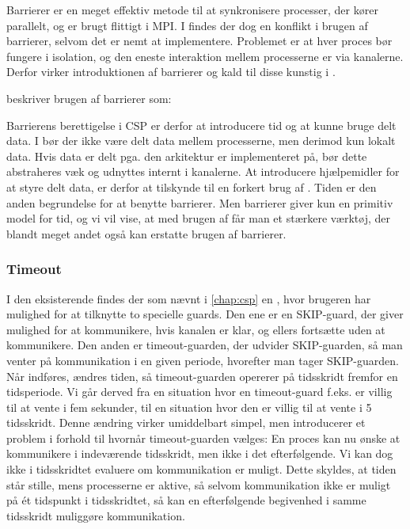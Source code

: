 Barrierer er en meget effektiv metode til at synkronisere processer, der kører 
parallelt, og er brugt flittigt i MPI. I \csp findes der dog en konflikt i brugen 
af barrierer, selvom det er nemt at implementere. Problemet er at hver proces bør fungere i isolation, og den eneste interaktion mellem processerne er via kanalerne. Derfor virker introduktionen af barrierer og kald til disse kunstig i \csp. 

\citeauthor{crew} beskriver brugen af barrierer som:
\begin{otherlanguage}{english}
\end{otherlanguage}
Barrierens berettigelse i CSP er derfor at  introducere tid og at kunne bruge delt data. I \csp bør der ikke være delt data mellem processerne, men derimod kun lokalt data. Hvis data er delt pga. den arkitektur \csp er implementeret på, bør dette abstraheres væk og udnyttes internt i kanalerne. At introducere hjælpemidler for at styre delt data, er derfor at tilskynde til en forkert brug af \csp. Tiden er den anden begrundelse for at benytte barrierer.
Men barrierer giver kun en  primitiv model for tid, og vi vil vise, at med brugen af \des får man et stærkere værktøj, der blandt meget andet også kan erstatte brugen af barrierer.

\subsubsection{Timeout} 
I den eksisterende \pycsp findes der som nævnt i \autoref{chap:csp} en , hvor brugeren har mulighed for at tilknytte to specielle guards. Den ene er en SKIP-guard, der giver mulighed for at kommunikere, hvis kanalen er klar, og ellers fortsætte uden at kommunikere. Den anden er timeout-guarden, der udvider SKIP-guarden, så man venter på kommunikation i en given periode, hvorefter man tager SKIP-guarden. 
Når \des indføres, ændres tiden, så timeout-guarden opererer på tidsskridt fremfor en tidsperiode. Vi går derved fra en situation hvor en timeout-guard f.eks. er villig til at vente i fem sekunder, til en situation hvor den er villig til at vente i 5 tidsskridt. Denne ændring virker umiddelbart simpel, men introducerer et problem i forhold til hvornår timeout-guarden vælges: En proces kan nu ønske at kommunikere i indeværende tidsskridt, men ikke i det efterfølgende. Vi kan dog ikke i tidsskridtet evaluere om kommunikation er muligt. Dette skyldes, at tiden står stille, mens processerne er aktive, så selvom kommunikation ikke er muligt på ét tidspunkt i tidsskridtet, så kan en efterfølgende begivenhed i samme tidsskridt muliggøre kommunikation.


